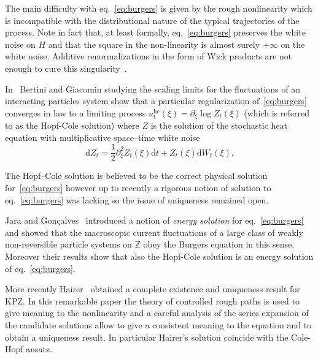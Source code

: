\documentclass[11pt,a4paper,reqno]{amsart}
\newcommand{\ZZ}{\mathbb{Z}}
\newcommand{\dd}{\mathrm{d}}
\begin{document}
The main difficulty with eq.~\eqref{eq:burgers} is given by the rough nonlinearity which is incompatible with the distributional nature of the typical trajectories of the process. Note in fact that, at least formally, eq.~\eqref{eq:burgers} preserves the white noise on $H$ and that the square in the non-linearity is almost surely $+\infty$ on the white noise. Additive renormalizations in the form of Wick products are not enough to cure this singularity~\cite{DDT}.

In~\cite{BG} Bertini and Giacomin studying  the scaling limits for the fluctuations of an interacting particles system  show that a particular regularization of~\eqref{eq:burgers}  converges in law to a limiting process $u^{\textrm{hc}}_t(\xi)=\partial_\xi \log Z_t(\xi)$ (which is referred to as the Hopf-Cole solution)  where $Z$ is the solution of the stochastic heat equation with multiplicative space--time white noise
\begin{equation}
\label{eq:she}
\dd Z_t = \frac12 \partial_\xi^2 Z_t(\xi) \dd t + Z_t(\xi) \dd W_t(\xi) .
\end{equation}

The Hopf--Cole solution is believed to be the correct physical solution for~\eqref{eq:burgers} however up to recently a rigorous notion of solution to eq.~\eqref{eq:burgers} was lacking so the issue of uniqueness remained open. 

Jara and Gon\c{c}alves~\cite{JG} introduced a notion of \emph{energy solution} for eq.~\eqref{eq:burgers}  and showed that  the macroscopic current fluctuations of a large class of weakly non-reversible particle systems on $\ZZ$ obey the Burgers equation in this sense. Moreover their results show that also the Hopf-Cole solution is an energy solution of eq.~\eqref{eq:burgers}.

More recently Hairer~\cite{Hairer} obtained a complete existence and uniqueness result for KPZ. In this remarkable paper the theory of controlled rough paths is used to give meaning to the nonlinearity and a careful analysis of the series expansion of the candidate solutions allow to give a consistent meaning to the equation and to obtain a uniqueness result. In particular Hairer's solution coincide with  the Cole-Hopf ansatz.
\end{document}
